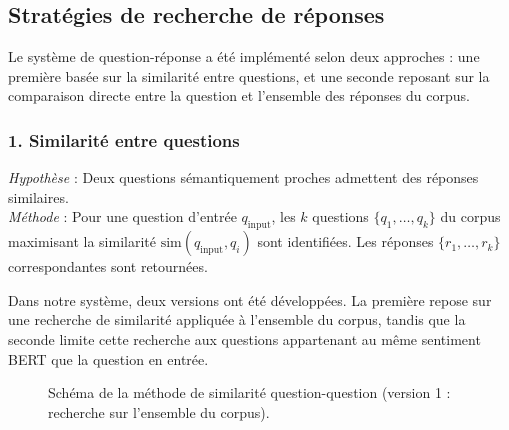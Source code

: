 \documentclass[12pt,a4paper]{report}
\begin{document}
\pagebreak

\subsection{Stratégies de recherche de réponses}

Le système de question-réponse a été implémenté selon deux approches : une première basée sur la similarité entre questions, et une seconde reposant sur la comparaison directe entre la question et l'ensemble des réponses du corpus.

\subsubsection{1. Similarité entre questions}

\textit{Hypothèse} : Deux questions sémantiquement proches admettent des réponses similaires.\\
\textit{Méthode} : Pour une question d'entrée $q_{\text{input}}$, les $k$ questions $\{q_1, \ldots, q_k\}$ du corpus maximisant la similarité $\text{sim}(q_{\text{input}}, q_i)$ sont identifiées. Les réponses $\{r_1, \ldots, r_k\}$ correspondantes sont retournées.

Dans notre système, deux versions ont été développées. La première repose sur une recherche de similarité appliquée à l'ensemble du corpus, tandis que la seconde limite cette recherche aux questions appartenant au même sentiment BERT que la question en entrée.

\begin{figure}[H]
\begin{center}
\end{center}
\caption{Schéma de la méthode de similarité question-question (version 1 : recherche sur l'ensemble du corpus).}
\end{figure}
\end{document}
